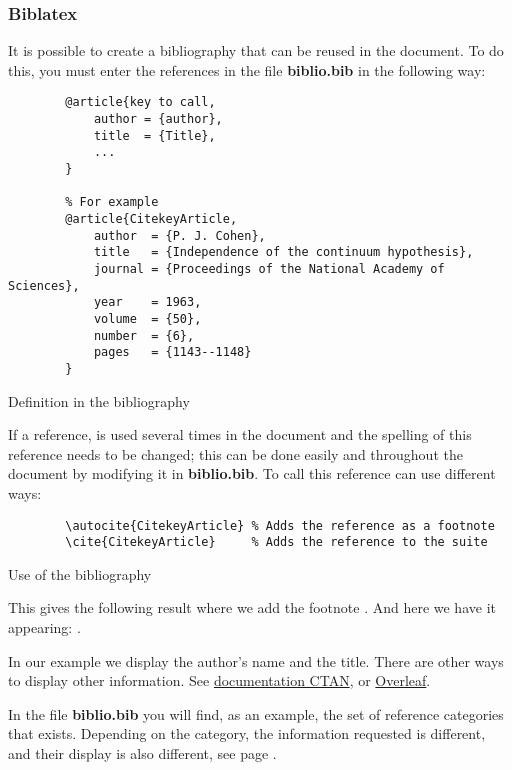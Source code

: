 \subsubsection{Biblatex}
It is possible to create a bibliography that can be reused in the document.
To do this, you must enter the references in the file \textbf{biblio.bib} in the following way:
\begin{code}
    \begin{verbatim}
        @article{key to call,
            author = {author},
            title  = {Title},
            ...
        }

        % For example
        @article{CitekeyArticle,
            author  = {P. J. Cohen},
            title   = {Independence of the continuum hypothesis},
            journal = {Proceedings of the National Academy of Sciences},
            year    = 1963,
            volume  = {50},
            number  = {6},
            pages   = {1143--1148}
        }
\end{verbatim}
    \caption{Definition in the bibliography}
\end{code}

If a reference, is used several times in the document and the spelling of this reference
needs to be changed; this can be done easily and throughout the document by modifying it in
\textbf{biblio.bib}.
To call this reference can use different ways:
\begin{code}
    \begin{verbatim}
        \autocite{CitekeyArticle} % Adds the reference as a footnote
        \cite{CitekeyArticle}     % Adds the reference to the suite
\end{verbatim}
    \caption{Use of the bibliography}
\end{code}

This gives the following result where we add the footnote \autocite{CitekeyArticle}.
And here we have it appearing: \cite{CitekeyArticle}. \newline

In our example we display the author's name and the title. There are other ways to display other
information. See
\href{https://mirror.ibcp.fr/pub/CTAN/macros/latex/contrib/biblatex/doc/biblatex.pdf#subsection.3.9}{documentation CTAN},
or \href{https://fr.overleaf.com/learn/latex/Bibliography_management_with_bibtex}{Overleaf}.
\newline

In the file \textbf{biblio.bib} you will find, as an example, the set of reference categories that
exists. Depending on the category, the information requested is different, and their display is also
different, see page \pageref{bibliography}.

